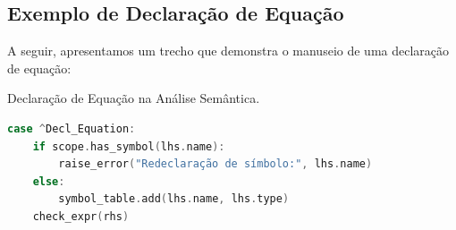 \subsection*{Exemplo de Declaração de Equação}

A seguir, apresentamos um trecho que demonstra o manuseio de uma declaração de equação:
\begin{codigo}[htb]
    \caption{\small Declaração de Equação na Análise Semântica.}
    \label{cod-equation-decl}
\begin{lstlisting}[language=C, numbers=none, frame=none, inputencoding=utf8]
case ^Decl_Equation:
    if scope.has_symbol(lhs.name):
        raise_error("Redeclaração de símbolo:", lhs.name)
    else:
        symbol_table.add(lhs.name, lhs.type)
    check_expr(rhs)
\end{lstlisting}
\end{codigo}


